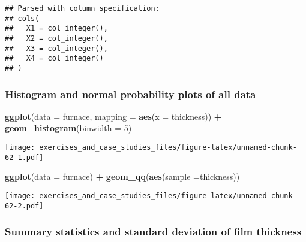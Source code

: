 \documentclass[]{book}
\newenvironment{Shaded}{\begin{snugshade}}{\end{snugshade}}
\newcommand{\DataTypeTok}[1]{\textcolor[rgb]{0.13,0.29,0.53}{#1}}
\newcommand{\DecValTok}[1]{\textcolor[rgb]{0.00,0.00,0.81}{#1}}
\newcommand{\KeywordTok}[1]{\textcolor[rgb]{0.13,0.29,0.53}{\textbf{#1}}}
\newcommand{\NormalTok}[1]{#1}
\newcommand{\OperatorTok}[1]{\textcolor[rgb]{0.81,0.36,0.00}{\textbf{#1}}}
\newcommand{\StringTok}[1]{\textcolor[rgb]{0.31,0.60,0.02}{#1}}
\theoremstyle{definition}
\theoremstyle{definition}
\theoremstyle{definition}
\theoremstyle{remark}
\begin{document}
\begin{verbatim}
## Parsed with column specification:
## cols(
##   X1 = col_integer(),
##   X2 = col_integer(),
##   X3 = col_integer(),
##   X4 = col_integer()
## )
\end{verbatim}

\hypertarget{histogram-and-normal-probability-plots-of-all-data}{%
\subsubsection{Histogram and normal probability plots of all
data}\label{histogram-and-normal-probability-plots-of-all-data}}

\begin{Shaded}
\begin{Highlighting}[]
\KeywordTok{ggplot}\NormalTok{(}\DataTypeTok{data =}\NormalTok{ furnace, }\DataTypeTok{mapping =} \KeywordTok{aes}\NormalTok{(}\DataTypeTok{x =}\NormalTok{ thickness)) }\OperatorTok{+}
\StringTok{  }\KeywordTok{geom_histogram}\NormalTok{(}\DataTypeTok{binwidth =} \DecValTok{5}\NormalTok{)}
\end{Highlighting}
\end{Shaded}

\texttt{[image: exercises\_and\_case\_studies\_files/figure-latex/unnamed-chunk-62-1.pdf]}

\begin{Shaded}
\begin{Highlighting}[]
\KeywordTok{ggplot}\NormalTok{(}\DataTypeTok{data =}\NormalTok{ furnace) }\OperatorTok{+}
\StringTok{  }\KeywordTok{geom_qq}\NormalTok{(}\KeywordTok{aes}\NormalTok{(}\DataTypeTok{sample =}\NormalTok{thickness))}
\end{Highlighting}
\end{Shaded}

\texttt{[image: exercises\_and\_case\_studies\_files/figure-latex/unnamed-chunk-62-2.pdf]}

\hypertarget{summary-statistics-and-standard-deviation-of-film-thickness}{%
\subsubsection{Summary statistics and standard deviation of film
thickness}\label{summary-statistics-and-standard-deviation-of-film-thickness}}

\begin{Shaded}
\end{Shaded}
\end{document}
